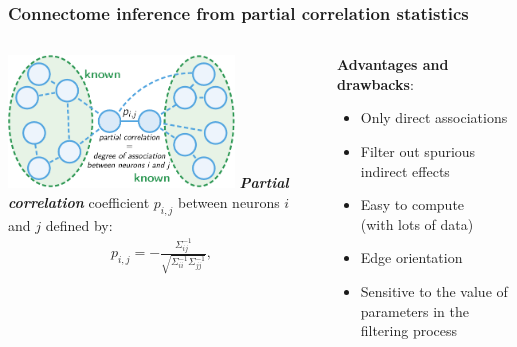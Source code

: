 \documentclass[final]{beamer}
\newcommand{\cmark}{\ding{51}}%
\newcommand{\xmark}{\ding{55}}%
\begin{document}
\begin{frame}

\frametitle{Connectome \textbf{inference} from {\color{red} partial correlation statistics}}

\begin{columns}
\begin{column}{0.55\linewidth}

\includegraphics[width=6cm]{images/network.pdf}
\vspace{10pt}
\textbf{\textit{Partial correlation}} coefficient $p_{i,j}$ between neurons $i$ and $j$ defined by:
\begin{align*}
p_{i,j} =
-\frac{\Sigma^{-1}_{ij}}{\sqrt{\Sigma^{-1}_{ii} \Sigma^{-1}_{jj}}}, \label{eq:inverse}
\end{align*}

\end{column}

\begin{column}{0.45\linewidth}


\textbf{Advantages and drawbacks}:
\begin{itemize}
\item[{\color{green} \cmark}] Only direct associations
\item[{\color{green} \cmark}] Filter out spurious indirect effects
\item[{\color{green} \cmark}] Easy to compute \\ (with lots of data) \\[2ex]
\item[{\color{red} \xmark}] Edge orientation
\item[{\color{red} \xmark}] Sensitive to the value of parameters in the filtering process
\end{itemize}



\end{column}

\end{columns}

\end{frame}
\end{document}
